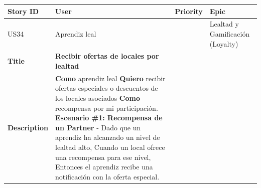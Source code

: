 {\def\LTcaptype{none} %
\begin{longtable}[]{@{}
  >{\raggedright\arraybackslash}p{}
  >{\raggedright\arraybackslash}p{}
  >{\raggedright\arraybackslash}p{}
  >{\raggedright\arraybackslash}p{}@{}}
\toprule\noalign{}
\begin{minipage}[b]{\linewidth}\raggedright
Story ID
\end{minipage} & \begin{minipage}[b]{\linewidth}\raggedright
User
\end{minipage} & \begin{minipage}[b]{\linewidth}\raggedright
Priority
\end{minipage} & \begin{minipage}[b]{\linewidth}\raggedright
Epic
\end{minipage} \\
\midrule\noalign{}
\endhead
\bottomrule\noalign{}
\endlastfoot
US34 & Aprendiz leal & 5 & Lealtad y Gamificación (Loyalty) \\
\textbf{Title} & \textbf{Recibir ofertas de locales por lealtad} & & \\
\textbf{Description} & \textbf{Como} aprendiz leal \textbf{Quiero}
recibir ofertas especiales o descuentos de los locales asociados
\textbf{Como} recompensa por mi participación. \textbf{Escenario \#1:
Recompensa de un Partner} - Dado que un aprendiz ha alcanzado un nivel
de lealtad alto, Cuando un local ofrece una recompensa para ese nivel,
Entonces el aprendiz recibe una notificación con la oferta especial. &
& \\
\end{longtable}
}

